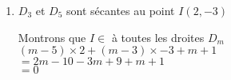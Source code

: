 \begin{enumerate}
\begin{enumerate}
\begin{minipage}{9.6cm}
$D_3 :$  
\begin{center}             
  {white}{$x=2$}
\end{center}                          
        \end{minipage}        
\end{enumerate} 

\item $D_3$ et $D_5$ sont sécantes au point $I(2,-3)$

Montrons que $I\in$ à toutes les droites $D_m$ \\

$(m-5)\times 2 + (m-3) \times -3 + m +1 $\\
$= 2m -10 -3m +9 +m +1 $\\
$= 0$ \\ 
     
\end{enumerate}


\ifdefined\COMPLETE
\else
    
\fi